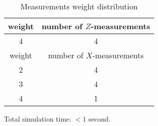 \documentclass[12pt]{article}
\begin{document}
\begin{table}[h]
\centering
\begin{tabular}{c c}
\hline
weight & number of $Z$-measurements\\
\hline
4 & 4\\
\hline
\hline
weight & number of $X$-measurements\\
\hline
2 & 4\\
3 & 4\\
4 & 1\\
\hline
\end{tabular}
\caption{Measurements weight distribution}
\end{table}
\vspace{.3cm}



\vspace{2cm}
Total simulation time: $< 1$ second.
\end{document}
